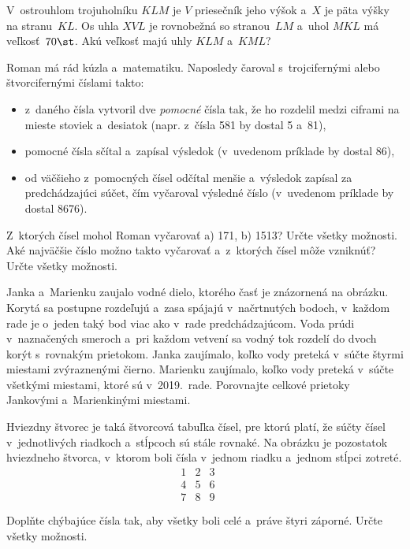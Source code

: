 {%
V~ostrouhlom trojuholníku $KLM$ je $V$ priesečník jeho výšok a~$X$ je päta výšky na stranu~$KL$.
Os uhla $XVL$ je rovnobežná so stranou~$LM$ a~uhol $MKL$ má veľkosť~$70\st$.
Akú veľkosť majú uhly $KLM$ a~$KML$?
}

{%
Roman má rád kúzla a~matematiku.
Naposledy čaroval s~trojcifernými alebo štvorcifernými číslami takto:
\begin{itemize}
\item z~daného čísla vytvoril dve {\it pomocné\/} čísla tak, že ho rozdelil medzi ciframi na mieste stoviek a~desiatok (napr. z~čísla 581 by dostal 5 a~81),
\item pomocné čísla sčítal a~zapísal výsledok (v~uvedenom príklade by dostal 86),
\item od väčšieho z~pomocných čísel odčítal menšie a~výsledok zapísal za predchádzajúci súčet, čím vyčaroval výsledné číslo (v~uvedenom príklade by dostal 8676).
\end{itemize}
\noindent
Z~ktorých čísel mohol Roman vyčarovať a) 171, b) 1513?
Určte všetky možnosti. Aké najväčšie číslo možno takto vyčarovať a~z~ktorých čísel môže vzniknúť?
Určte všetky možnosti.
}

{%
Janka a~Marienku zaujalo vodné dielo, ktorého časť je znázornená na obrázku.
Korytá sa postupne rozdeľujú a~zasa spájajú v~načrtnutých bodoch, v~každom rade je o~jeden taký bod viac ako v~rade predchádzajúcom.
Voda prúdi v~naznačených smeroch a~pri každom vetvení sa vodný tok rozdelí do dvoch korýt s~rovnakým prietokom.
Janka zaujímalo, koľko vody preteká v~súčte štyrmi miestami zvýraznenými čierno.
Marienku zaujímalo, koľko vody preteká v~súčte všetkými miestami, ktoré sú v~2019.~rade.
Porovnajte celkové prietoky Jankovými a~Marienkinými miestami.
%
}

{%
Hviezdny štvorec je taká štvorcová tabuľka čísel, pre ktorú platí, že súčty čísel v~jednotlivých riadkoch a~stĺpcoch sú stále rovnaké.
Na obrázku je pozostatok hviezdneho štvorca, v~ktorom boli čísla v~jednom riadku a~jednom stĺpci zotreté.
$$
\begin{array}{cccc}
1 & 2 & 3 & \phantom{0} \\
4 & 5 & 6 & \\
7 & 8 & 9 & \\
 & & & \\
\end{array}
$$
Doplňte chýbajúce čísla tak, aby všetky boli celé a~práve štyri záporné.
Určte všetky možnosti.
}

